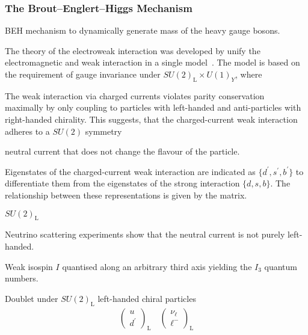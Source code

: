 \subsubsection{The Brout--Englert--Higgs Mechanism}

BEH mechanism to dynamically generate mass of the heavy gauge bosons.


The theory of the electroweak interaction was developed by unify the
electromagnetic and weak interaction in a single
model~\cite{Glashow:1961tr,Salam:1964ry,Weinberg:1967tq}. The model is based on
the requirement of gauge invariance under $SU(2)_{\text{L}} \times U(1)_{Y}$,
where



The weak interaction via charged currents violates parity
conservation~\cite{Wu:1957my} maximally by only coupling to particles with
left-handed and anti-particles with right-handed chirality. This suggests, that
the charged-current weak interaction adheres to a $SU(2)$ symmetry


neutral current that does not change the flavour of the particle.

Eigenstates of the charged-current weak interaction are indicated as
$\{ d^\prime, s^\prime, b^\prime \}$ to differentiate them from the eigenstates
of the strong interaction $\{ d, s, b \}$. The relationship between these
representations is given by the  matrix.

$SU(2)_{\text{L}}$

Neutrino scattering experiments show that the neutral current is not purely
left-handed.


Weak isospin $I$ quantised along an arbitrary third axis yielding the $I_3$
quantum numbers.


Doublet under $SU(2)_{\text{L}}$ left-handed chiral particles
\begin{align*}
  \begin{pmatrix}
    u \\
    d^\prime
  \end{pmatrix}_{\text{L}}
  \quad
  \begin{pmatrix}
    \nu_\ell \\
    \ell^{-}
  \end{pmatrix}_{\text{L}}
\end{align*}


